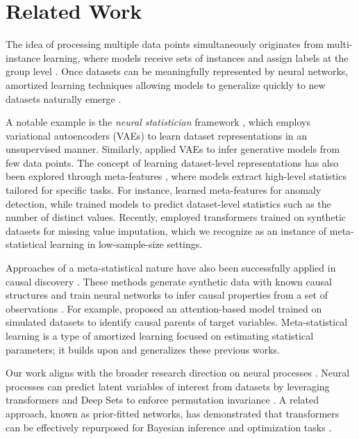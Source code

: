 \section{Related Work}
The idea of processing multiple data points simultaneously originates from multi-instance learning, where models receive sets of instances and assign labels at the group level \cite{maron1997framework, dietterich1997solving, ilse2018attention}. Once datasets can be meaningfully represented by neural networks, amortized learning techniques allowing models to generalize quickly to new datasets naturally emerge \cite{ganguly2023amortized, lopez2015towards, kim2024targeted}.

A notable example is the \textit{neural statistician} framework \cite{edwards2017towards}, which employs variational autoencoders (VAEs) to learn dataset representations in an unsupervised manner. Similarly, \citet{hewitt2018variational} applied VAEs to infer generative models from few data points. The concept of learning dataset-level representations has also been explored through meta-features \cite{jomaa2021dataset2vec, kotlar2021novel, 10136150}, where models extract high-level statistics tailored for specific tasks. For instance, \citet{kotlar2021novel} learned meta-features for anomaly detection, while \citet{wu2022learning} trained models to predict dataset-level statistics such as the number of distinct values. Recently, \citet{hollmann2025accurate} employed transformers trained on synthetic datasets for missing value imputation, which we recognize as an instance of meta-statistical learning in low-sample-size settings.

Approaches of a meta-statistical nature have also been successfully applied in causal discovery \cite{lopez2015towards, lowe2022amortized, lorch2022amortized, wu2024sample}. These methods generate synthetic data with known causal structures and train neural networks to infer causal properties from a set of observations \cite{kelearning}. For example, \citet{kim2024targeted} proposed an attention-based model trained on simulated datasets to identify causal parents of target variables. Meta-statistical learning is a type of amortized learning focused on estimating statistical parameters; it builds upon and generalizes these previous works. 

Our work aligns with the broader research direction on neural processes \cite{garnelo2018neural, garnelo2018conditional,kim2019attentive, Gordon:2020, markou2022practical, huang2023practical, BruinsmaMRFAVBH23}. Neural processes can predict latent variables of interest from datasets \cite{chang2025amortized} by leveraging transformers \cite{pmlr-v162-nguyen22b} and Deep Sets \cite{NIPS2017_f22e4747} to enforce permutation invariance \cite{JMLR:v21:19-322}. A related approach, known as prior-fitted networks, has demonstrated that transformers can be effectively repurposed for Bayesian inference \cite{muller2022transformers} and optimization tasks \cite{pmlr-v202-muller23a}.

